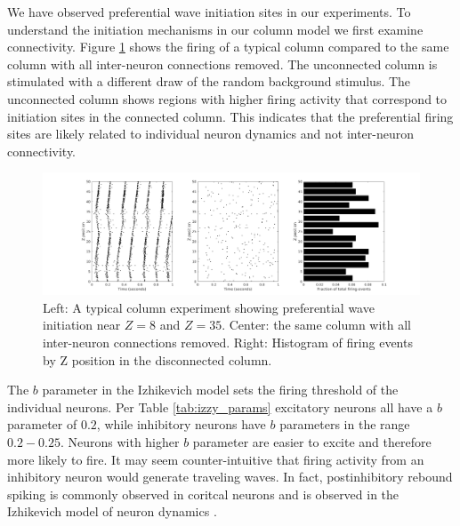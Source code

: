 \documentclass[a4paper,11pt]{article}
\begin{document}
We have observed preferential wave initiation sites in our experiments.
To understand the initiation mechanisms in our column model we first examine connectivity.
Figure \ref{fig:initiation_baseline} shows the firing of a typical column compared to the same column with all inter-neuron connections removed.
The unconnected column is stimulated with a different draw of the random background stimulus.
The unconnected column shows regions with higher firing activity that correspond to initiation sites in the connected column.
This indicates that the preferential firing sites are likely related to individual neuron dynamics and not inter-neuron connectivity.
\begin{figure}[!htb]
 \caption{Left: A typical column experiment showing preferential wave initiation near $Z=8$ and $Z=35$. Center: the same column with all inter-neuron connections removed. Right: Histogram of firing events by Z position in the disconnected column.}
 \label{fig:initiation_baseline}
 \centering
   \includegraphics[width=\textwidth]{fig/InitiationBaseline}
\end{figure}

The $b$ parameter in the Izhikevich model sets the firing threshold of the individual neurons.
Per Table \ref{tab:izzy_params} excitatory neurons all have a $b$ parameter of $0.2$, while inhibitory neurons have $b$ parameters in the range $0.2-0.25$.
Neurons with higher $b$ parameter are easier to excite and therefore more likely to fire.
It may seem counter-intuitive that firing activity from an inhibitory neuron would generate traveling waves.
In fact, postinhibitory rebound spiking is commonly observed in coritcal neurons \cite{ascoli2010} and is observed in the Izhikevich model of neuron dynamics \cite{izhikevich}.
\end{document}
